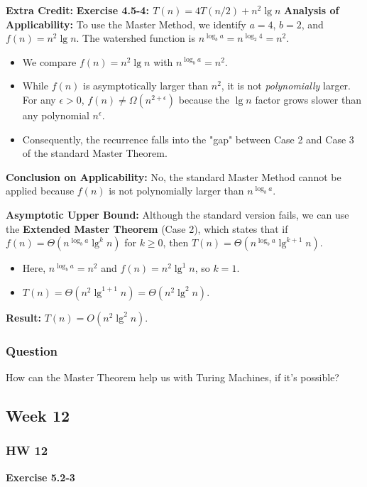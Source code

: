 \documentclass{article}
\theoremstyle{theorem}
\theoremstyle{definition}
\theoremstyle{remark}
\begin{document}
\textbf{Extra Credit:}
\textbf{Exercise 4.5-4: $T(n) = 4T(n/2) + n^2 \lg n$}
\textbf{Analysis of Applicability:}
To use the Master Method, we identify $a = 4$, $b = 2$, and $f(n) = n^2 \lg n$.
The watershed function is $n^{\log_b a} = n^{\log_2 4} = n^2$.

\begin{itemize}
    \item We compare $f(n) = n^2 \lg n$ with $n^{\log_b a} = n^2$.
    \item While $f(n)$ is asymptotically larger than $n^2$, it is not \textit{polynomially} larger. For any $\epsilon > 0$, $f(n) \neq \Omega(n^{2+\epsilon})$ because the $\lg n$ factor grows slower than any polynomial $n^\epsilon$.
    \item Consequently, the recurrence falls into the "gap" between Case 2 and Case 3 of the standard Master Theorem.
\end{itemize}

\textbf{Conclusion on Applicability:} 
No, the standard Master Method cannot be applied because $f(n)$ is not polynomially larger than $n^{\log_b a}$.

\vspace{1em}

\textbf{Asymptotic Upper Bound:}
Although the standard version fails, we can use the \textbf{Extended Master Theorem} (Case 2), which states that if $f(n) = \Theta(n^{\log_b a} \lg^k n)$ for $k \geq 0$, then $T(n) = \Theta(n^{\log_b a} \lg^{k+1} n)$.
\begin{itemize}
    \item Here, $n^{\log_b a} = n^2$ and $f(n) = n^2 \lg^1 n$, so $k = 1$.
    \item $T(n) = \Theta(n^2 \lg^{1+1} n) = \Theta(n^2 \lg^2 n)$.
\end{itemize}

\textbf{Result:} $T(n) = O(n^2 \lg^2 n)$.

\subsubsection{Question}
How can the Master Theorem help us with Turing Machines, if it's possible?

\subsection{Week 12}

\subsubsection{HW 12}
\textbf{Exercise 5.2-3}
\end{document}
